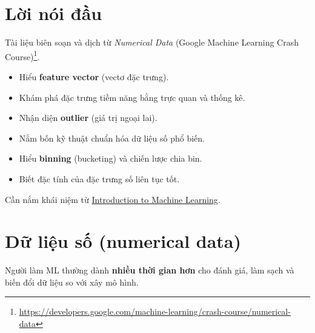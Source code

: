 \documentclass[12pt,a4paper]{article}
\begin{document}

\newpage\tableofcontents\newpage

\section*{Lời nói đầu}

\begin{ynghia}[title={Nguồn và cách đọc}]
Tài liệu biên soạn và dịch từ \emph{Numerical Data} (Google Machine Learning Crash Course)\footnote{\url{https://developers.google.com/machine-learning/crash-course/numerical-data}}.
\end{ynghia}

\begin{phuongphap}[title={target học tập}]
\begin{itemize}
  \item Hiểu \textbf{feature vector} (vectơ đặc trưng).
  \item Khám phá đặc trưng tiềm năng bằng trực quan và thống kê.
  \item Nhận diện \textbf{outlier} (giá trị ngoại lai).
  \item Nắm bốn kỹ thuật chuẩn hóa dữ liệu số phổ biến.
  \item Hiểu \textbf{binning} (bucketing) và chiến lược chia bin.
  \item Biết đặc tính của đặc trưng số liên tục tốt.
\end{itemize}
\end{phuongphap}

\begin{luuy}[title={Điều kiện tiên quyết}]
Cần nắm khái niệm từ \href{https://developers.google.com/machine-learning/intro-to-ml}{Introduction to Machine Learning}.
\end{luuy}

\newpage

\section{Dữ liệu số (numerical data)}

\begin{dongco}
Người làm ML thường dành \textbf{nhiều thời gian hơn} cho đánh giá, làm sạch và biến đổi dữ liệu so với xây mô hình.
\end{dongco}
\end{document}
